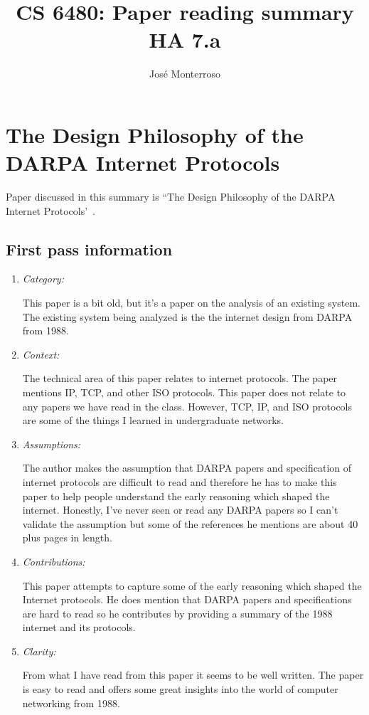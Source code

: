 \documentclass[letterpaper,twocolumn,10pt]{article}
\title{CS 6480: Paper reading summary\\
HA 7.a\\}
\author{José Monterroso}
\affil{School of Computing, University of Utah}
\begin{document}
\maketitle
\section{The Design Philosophy of the DARPA Internet Protocols}

Paper discussed in this summary is ``The Design Philosophy of the DARPA Internet Protocols'~\cite{openflow.wp}.

\subsection{First pass information}
\label{sec:first}

\begin{enumerate}

\item {\it Category:} 

This paper is a bit old, but it's a paper on the analysis of an existing system. The existing system being analyzed is the 
the internet design from DARPA from 1988. 

\item {\it Context:} 

The technical area of this paper relates to internet protocols. The paper mentions IP, TCP, and other ISO protocols. 
This paper does not relate to any papers we have read in the class. However, TCP, IP, and ISO protocols are some 
of the things I learned in undergraduate networks. 

\item {\it Assumptions:} 

The author makes the assumption that DARPA papers and specification of internet protocols are difficult to read
and therefore he has to make this paper to help people understand the early reasoning which shaped the internet. 
Honestly, I've never seen or read any DARPA papers so I can't validate the assumption but some of the references
he mentions are about 40 plus pages in length.

\item {\it Contributions:} 

This paper attempts to capture some of the early reasoning which shaped the Internet protocols. He does 
mention that DARPA papers and specifications are hard to read so he contributes by providing a summary 
of the 1988 internet and its protocols. 

\item {\it Clarity:} 

From what I have read from this paper it seems to be well written. The paper is easy to read and offers some great 
insights into the world of computer networking from 1988.

\end{enumerate}
\end{document}
